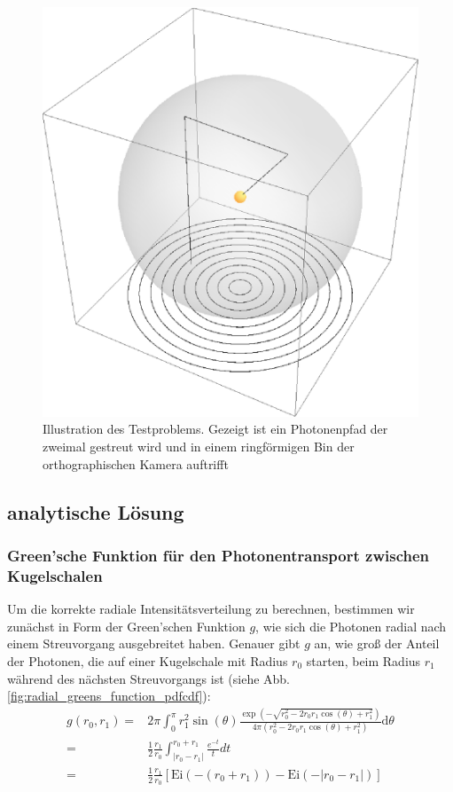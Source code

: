 	\begin{figure}
			\centering
			\includegraphics[height=0.3\textheight]{testproblem_illustration.eps}
			\caption{Illustration des Testproblems. Gezeigt ist ein Photonenpfad der zweimal gestreut wird und in einem ringförmigen Bin der orthographischen Kamera auftrifft}
			\label{fig:testproblem_sketch}
	\end{figure}

	
	\subsection{analytische Lösung}\label{subsec:homsphere_analytic_solution}
	\subsubsection{Green'sche Funktion für den Photonentransport zwischen Kugelschalen}
	Um die korrekte radiale Intensitätsverteilung zu berechnen, bestimmen wir zunächst in Form der Green'schen Funktion $g$, wie sich die Photonen radial nach einem Streuvorgang ausgebreitet haben.
	Genauer gibt $g$ an, wie groß der Anteil der Photonen, die auf einer Kugelschale mit Radius $r_0$ starten, beim Radius $r_1$ während des nächsten Streuvorgangs ist (siehe Abb. \ref{fig:radial_greens_function_pdfcdf}):
	\begin{align*}
		g(r_0,r_1) =& 2 \pi \int_0^\pi r_1^2 \sin(\theta) \frac{\exp\left(-\sqrt{r_0^2-2 r_0 r_1 \cos(\theta)+r_1^2}\right)}{4 \pi (r_0^2-2 r_0 r_1 \cos(\theta)+r_1^2)} \text{d}\theta \\
		=& \frac{1}{2}\frac{r_1}{r_0} \int_{|r_0-r_1|}^{r_0+r_1} \frac{e^{-t}}{t} dt \\
		=& \frac{1}{2}\frac{r_1}{r_0}\left[\text{Ei}(-(r_0+r_1)) - \text{Ei}(-|r_0-r_1|)\right]
	\end{align*}
	
